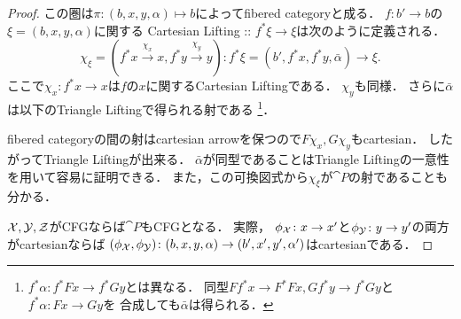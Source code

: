\documentclass[a4paper, dvipdfmx]{jsarticle}
\begin{document}
\begin{proof}
    この圏は$\pi \colon (b,x,y,\alpha) \mapsto b$によってfibered categoryと成る．
    $f \colon b' \to b$の$\xi=(b, x, y, \alpha)$に関する
    Cartesian Lifting :: $f^*\xi \to \xi$は次のように定義される．
    \[
        \chi_{\xi}=(f^*x \xrightarrow{\chi_x} x, f^*y \xrightarrow{\chi_y} y)
        \colon
        f^*\xi=(b', f^*x, f^*y, \bar{\alpha}) \to \xi.
    \]
    ここで$\chi_x \colon f^*x \to x$は$f$の$x$に関するCartesian Liftingである．
    $\chi_y$も同様．
    さらに$\bar{\alpha}$は以下のTriangle Liftingで得られる射である
    \footnote
    {
        $f^*\alpha \colon f^*Fx \to f^*Gy$とは異なる．
        同型$Ff^*x \to F^*Fx, Gf^*y \to f^*Gy$と$f^*\alpha \colon Fx \to Gy$を
        合成しても$\bar{\alpha}$は得られる．
    }．
    \begin{center}
    \end{center}
    fibered categoryの間の射はcartesian arrowを保つので$F\chi_x, G\chi_y$もcartesian．
    したがってTriangle Liftingが出来る．
    $\bar{\alpha}$が同型であることはTriangle Liftingの一意性を用いて容易に証明できる．
    また，この可換図式から$\chi_{\xi}$が$\cat{P}$の射であることも分かる．

    $\mathcal{X}, \mathcal{Y}, \mathcal{Z}$がCFGならば$\cat{P}$もCFGとなる．
    実際，
    $\phi_{\mathcal{X}} \colon x \to x'$と$\phi_{\mathcal{Y}} \colon y \to y'$の両方がcartesianならば
    $(\phi_{\mathcal{X}}, \phi_{\mathcal{Y}}) \colon (b, x, y, \alpha) \to (b', x', y', \alpha')$はcartesianである．


\end{proof}
\end{document}
